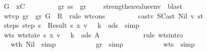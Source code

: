 \begin{isabellebody}
\ \ \ \ \ \ \ \ \isamarkupfalse \ {\isacharquery}G{}\ {\isacharequal}\ {\isachardoublequoteopen}{\isacharparenleft}x{\isacharcomma}C{\isacharparenright}{\isacharhash}{\isasymGamma}{\isachardoublequoteclose}\isanewline
\ \ \ \ \ \ \ \ \isamarkupfalse \ gr\ ss\ \isamarkupfalse \ gr{}{\isacharcolon}\ {\isachardoublequoteopen}{\isasymGamma}{\isacharsemicolon}{\isasymSigma}{\isacharprime}\ {\isasymturnstile}\ {\isasymrho}{\isachardoublequoteclose}\ \isamarkupfalse \ strengthen{\isacharunderscore}value{\isacharunderscore}env\ \isamarkupfalse \ blast\isanewline
\ \ \ \ \ \ \ \ \isamarkupfalse \ wtvp\ gr{}\ \isamarkupfalse \ gr{}{\isacharcolon}\ {\isachardoublequoteopen}{\isacharquery}G{}{\isacharsemicolon}{\isasymSigma}{\isacharprime}\ {\isasymturnstile}\ {\isacharquery}R{}{\isachardoublequoteclose}\ \isamarkupfalse \ {\isacharparenleft}rule\ wt{\isacharunderscore}cons{\isacharparenright}\isanewline
\ \ \ \ \ \ \ \ \isamarkupfalse \ castv\ SCast\ Nil\ v\ st\isanewline
\ \ \ \ \ \ \ \ \isamarkupfalse \ steps{\isacharcolon}\ {\isachardoublequoteopen}step\ s\ {\isacharequal}\ Result\ {\isacharparenleft}s{\isacharprime}{\isacharcomma}\ {\isacharparenleft}x{\isacharcomma}\ v{\isacharprime}{\isacharparenright}\ {\isacharhash}\ {\isasymrho}{\isacharcomma}\ k{\isacharcomma}\ {\isasymmu}{\isacharprime}{\isacharcomma}\ ads{}{\isacharparenright}{\isachardoublequoteclose}\ \isamarkupfalse \ simp\isanewline
\ \ \ \ \ \ \ \ \isamarkupfalse \ wt{\isacharunderscore}s{\isacharcolon}\ {\isachardoublequoteopen}wt{\isacharunderscore}state\ {\isacharparenleft}s{\isacharprime}{\isacharcomma}\ {\isacharparenleft}x{\isacharcomma}\ v{\isacharprime}{\isacharparenright}\ {\isacharhash}\ {\isasymrho}{\isacharcomma}\ k{\isacharcomma}\ {\isasymmu}{\isacharprime}{\isacharcomma}\ ads{}{\isacharparenright}\ A{\isachardoublequoteclose}\ \isanewline
\ \ \ \ \ \ \ \ \ \ \isamarkupfalse \ {\isacharparenleft}rule\ wts{\isacharunderscore}intro{\isacharparenright}\isanewline
\ \ \ \ \ \ \ \ \ \ \isamarkupfalse \ wth{}\ Nil\ \isamarkupfalse \ simp\isanewline
\ \ \ \ \ \ \ \ \ \ \isamarkupfalse \ gr{}\ \isamarkupfalse \ simp\isanewline
\ \ \ \ \ \ \ \ \ \ \isamarkupfalse \ wts{}\ \isamarkupfalse \ simp\isanewline

\end{isabellebody}
